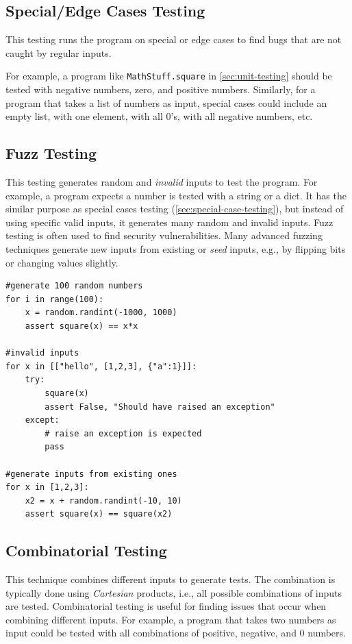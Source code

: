 \documentclass[oneside,11pt,dvipsnames]{book}
\newcommand{\code}[1]{\texttt{#1}}
\begin{document}
\subsection{Special/Edge Cases Testing}\label{sec:special-case-testing}

This testing runs the program on special or edge cases to find bugs that are not caught by regular inputs.


For example, a program like \code{MathStuff.square} in \autoref{sec:unit-testing} should be tested with negative numbers, zero, and positive numbers. Similarly, for a program that takes a list of numbers as input, special cases could include an empty list, with one element, with all 0's, with all negative numbers, etc.


\subsection{Fuzz Testing}
This testing generates random and \emph{invalid} inputs to test the program. For example, a program expects a number is tested with a string or a dict.  It has the similar purpose as special cases testing (\autoref{sec:special-case-testing}), but instead of using specific valid inputs, it generates many random and invalid inputs. Fuzz testing is often used to find security vulnerabilities. Many advanced fuzzing techniques generate new inputs from existing or \emph{seed} inputs, e.g., by flipping bits or changing values slightly.

\begin{lstlisting}
#generate 100 random numbers
for i in range(100):
    x = random.randint(-1000, 1000)
    assert square(x) == x*x

#invalid inputs
for x in [["hello", [1,2,3], {"a":1}]]:
    try:
        square(x)
        assert False, "Should have raised an exception"
    except:
        # raise an exception is expected
        pass
    
#generate inputs from existing ones
for x in [1,2,3]:
    x2 = x + random.randint(-10, 10)
    assert square(x) == square(x2)
\end{lstlisting}




\subsection{Combinatorial Testing}\label{sec:combinatorial-testing}
This technique combines different inputs to generate tests.  The combination is typically done using \emph{Cartesian} products, i.e., all possible combinations of inputs are tested. Combinatorial testing is useful for finding issues that occur when combining different inputs. For example, a program that takes two numbers as input could be tested with all combinations of positive, negative, and 0 numbers. 
\end{document}
